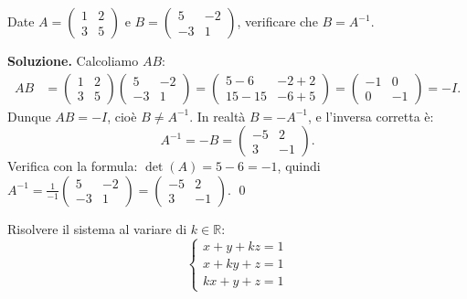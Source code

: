 \begin{examplebox}
Date $A = \begin{pmatrix} 1 & 2 \\ 3 & 5 \end{pmatrix}$ e $B = \begin{pmatrix} 5 & -2 \\ -3 & 1 \end{pmatrix}$, verificare che $B = A^{-1}$.
\end{examplebox}

\textbf{Soluzione.} Calcoliamo $AB$:
\begin{align*}
AB &= \begin{pmatrix} 1 & 2 \\ 3 & 5 \end{pmatrix}\begin{pmatrix} 5 & -2 \\ -3 & 1 \end{pmatrix} = \begin{pmatrix} 5{-}6 & -2{+}2 \\ 15{-}15 & -6{+}5 \end{pmatrix} = \begin{pmatrix} -1 & 0 \\ 0 & -1 \end{pmatrix} = -I.
\end{align*}
Dunque $AB = -I$, cioè $B \neq A^{-1}$. In realtà $B = -A^{-1}$, e l'inversa corretta è:
\[ A^{-1} = -B = \begin{pmatrix} -5 & 2 \\ 3 & -1 \end{pmatrix}. \]
Verifica con la formula: $\det(A) = 5 - 6 = -1$, quindi $A^{-1} = \frac{1}{-1}\begin{pmatrix} 5 & -2 \\ -3 & 1 \end{pmatrix} = \begin{pmatrix} -5 & 2 \\ 3 & -1 \end{pmatrix}$. \checkmark \qed

\medskip

\begin{examplebox}
Risolvere il sistema al variare di $k \in \mathbb{R}$:
\[
\begin{cases}
x + y + kz = 1 \\
x + ky + z = 1 \\
kx + y + z = 1
\end{cases}
\]
\end{examplebox}

